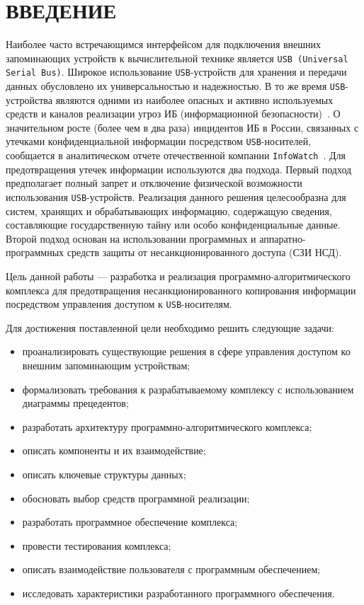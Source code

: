 \chapter*{ВВЕДЕНИЕ}

Наиболее часто встречающимся интерфейсом для подключения внешних запоминающих
устройств к вычислительной технике является \texttt{USB (Universal Serial Bus)}. 
Широкое использование \texttt{USB}-устройств для хранения и передачи данных 
обусловлено их универсальностью и надежностью. В то же время \texttt{USB}-устройства 
являются одними из наиболее опасных и активно используемых средств и каналов реализации 
угроз ИБ (информационной безопасности)~\cite{WhyUSB}. О значительном росте (более чем в два раза) 
инцидентов ИБ в России, связанных с утечками конфиденциальной информации посредством \texttt{USB}-носителей, 
сообщается в аналитическом отчете отечественной компании \texttt{InfoWatch}~\cite{InfoWatchAnalytics}.
Для предотвращения утечек информации используются два подхода. Первый подход предполагает полный 
запрет и отключение физической возможности использования \texttt{USB}-устройств. Реализация данного 
решения целесообразна для систем, хранящих и обрабатывающих информацию, содержащую сведения, составляющие 
государственную тайну или особо конфиденциальные данные. Второй подход основан на использовании программных 
и аппаратно-программных средств защиты от несанкционированного доступа (СЗИ НСД).

Цель данной работы --- разработка и реализация программно-алгоритмического комплекса для предотвращения 
несанкционированного копирования информации посредством управления доступом к \texttt{USB}-носителям.

Для достижения поставленной цели необходимо решить следующие задачи:
\begin{itemize}[label=---]
    \item проанализировать существующие решения в сфере управления доступом ко внешним запоминающим устройствам;
    \item формализовать требования к разрабатываемому комплексу с использованием диаграммы прецедентов;
    \item разработать архитектуру программно-алгоритмического комплекса;
    \item описать компоненты и их взаимодействие;
    \item описать ключевые структуры данных;
    \item обосновать выбор средств программной реализации;
    \item разработать программное обеспечение комплекса;
    \item провести тестирования комплекса;
    \item описать взаимодействие пользователя с программным обеспечением;
    \item исследовать характеристики разработанного программного обеспечения.
\end{itemize}